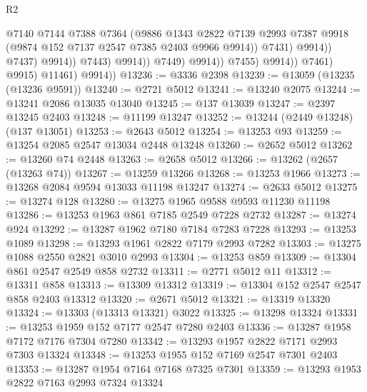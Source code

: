 \begin{lexlean}{R2}
\begin{coremodule}
                                            @7140
                                            @7144
                                            @7388
                                            @7364
                                            (@9886
                                              @1343
                                              @2822
                                              @7139
                                              @2993
                                              @7387
                                              @9918
                                              (@9874 @152 @7137 @2547 @7385 @2403 @9966 @9914))
                                            @7431)
                                          @9914))
                                      @7437)
                                    @9914))
                                @7443)
                              @9914))
                          @7449)
                        @9914))
                    @7455)
                  @9914))
              @7461)
            @9915)
          @11461)
        @9914))
@13236 := @3336 @2398
@13239 := @13059 (@13235 (@13236 @9591))
@13240 := @2721 @5012
@13241 := @13240 @2075
@13244 := @13241 @2086 @13035 @13040
@13245 := @137 @13039
@13247 := @2397 @13245 @2403
@13248 := @11199 @13247
@13252 := @13244 (@2449 @13248) (@137 @13051)
@13253 := @2643 @5012
@13254 := @13253 @93
@13259 := @13254 @2085 @2547 @13034 @2448 @13248
@13260 := @2652 @5012
@13262 := @13260 @74 @2448
@13263 := @2658 @5012
@13266 := @13262 (@2657 (@13263 @74))
@13267 := @13259 @13266
@13268 := @13253 @1966
@13273 := @13268 @2084 @9594 @13033 @11198 @13247
@13274 := @2633 @5012
@13275 := @13274 @128
@13280 := @13275 @1965 @9588 @9593 @11230 @11198
@13286 := @13253 @1963 @861 @7185 @2549 @7228 @2732
@13287 := @13274 @924
@13292 := @13287 @1962 @7180 @7184 @7283 @7228
@13293 := @13253 @1089
@13298 := @13293 @1961 @2822 @7179 @2993 @7282
@13303 := @13275 @1088 @2550 @2821 @3010 @2993
@13304 := @13253 @859
@13309 := @13304 @861 @2547 @2549 @858 @2732
@13311 := @2771 @5012 @11
@13312 := @13311 @858
@13313 := @13309 @13312
@13319 := @13304 @152 @2547 @2547 @858 @2403 @13312
@13320 := @2671 @5012
@13321 := @13319 @13320
@13324 := @13303 (@13313 @13321) @3022
@13325 := @13298 @13324
@13331 := @13253 @1959 @152 @7177 @2547 @7280 @2403
@13336 := @13287 @1958 @7172 @7176 @7304 @7280
@13342 := @13293 @1957 @2822 @7171 @2993 @7303 @13324
@13348 := @13253 @1955 @152 @7169 @2547 @7301 @2403
@13353 := @13287 @1954 @7164 @7168 @7325 @7301
@13359 := @13293 @1953 @2822 @7163 @2993 @7324 @13324

\end{coremodule}
\end{lexlean}
